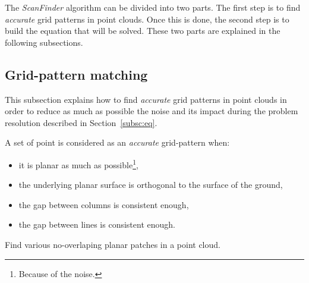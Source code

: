 The \emph{ScanFinder} algorithm can be divided into two parts. The first step is to find \emph{accurate} grid patterns in point clouds. Once this is done, the second step is to build the equation that will be solved. These two parts are explained in the following subsections.

\subsection{Grid-pattern matching}
This subsection explains how to find \emph{accurate} grid patterns in point clouds in order to reduce as much as possible the noise and its impact during the problem resolution described in Section~\ref{subsc:eq}.

A set of point is considered as an \emph{accurate} grid-pattern when:
\begin{itemize}
  \item it is planar as much as possible\footnote{Because of the noise.},
  \item the underlying planar surface is orthogonal to the surface of the ground,
  \item the gap between columns is consistent enough,
  \item the gap between lines is consistent enough.
\end{itemize}


\begin{algorithm}[tb]
  \SetAlgoVlined
  \DontPrintSemicolon
  \SetArgSty{}
  \caption{Find various no-overlaping planar patches in a point cloud.
    \label{alg:GetPlanarPatches}}
\end{algorithm}

